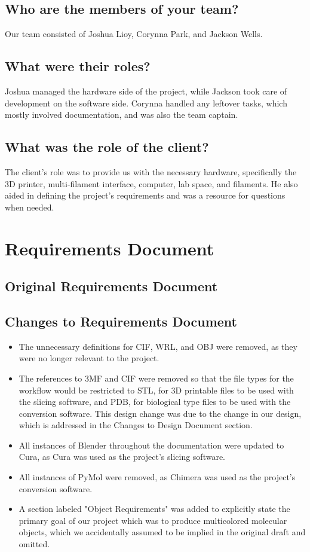\documentclass[letterpaper, onecolumn, draftclsnofoot, 10pt, compsoc]{IEEEtran}
\begin{document}
\begin{singlespace}
\subsection{Who are the members of your team?}
Our team consisted of Joshua Lioy, Corynna Park, and Jackson Wells.
\subsection{What were their roles?}
Joshua managed the hardware side of the project, while Jackson took care of development on the software side. Corynna handled any leftover tasks, which mostly involved documentation, and was also the team captain. 
\subsection{What was the role of the client?}
The client's role was to provide us with the necessary hardware, specifically the 3D printer, multi-filament interface, computer, lab space, and filaments. 
He also aided in defining the project's requirements and was a resource for questions when needed.

\section{Requirements Document}
\subsection{Original Requirements Document}

\subsection{Changes to Requirements Document} %
\begin{itemize}
\item The unnecessary definitions for CIF, WRL, and OBJ were removed, as they were no longer relevant to the project.
\item The references to 3MF and CIF were removed so that the file types for the workflow would be restricted to STL, for 3D printable files to be used with the slicing software, and PDB, for biological type files to be used with the conversion software.
This design change was due to the change in our design, which is addressed in the Changes to Design Document section.
\item All instances of Blender throughout the documentation were updated to Cura, as Cura was used as the project's slicing software.
\item All instances of PyMol were removed, as Chimera was used as the project's conversion software.
\item A section labeled "Object Requirements" was added to explicitly state the primary goal of our project which was to produce multicolored molecular objects, which we accidentally assumed to be implied in the original draft and omitted.
\end{itemize}

\end{singlespace}
\end{document}
